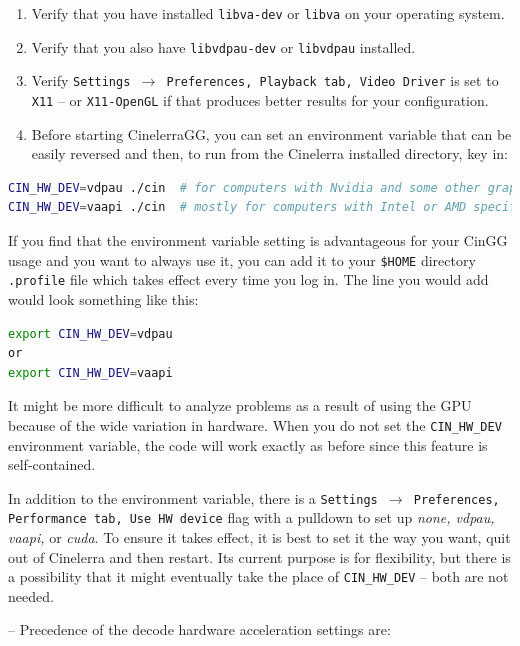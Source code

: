 \begin{enumerate}
	\item Verify that you have installed \texttt{libva-dev} or \texttt{libva} on your operating system.
	\item Verify that you also have \texttt{libvdpau-dev} or \texttt{libvdpau} installed.
	\item Verify \texttt{Settings $\rightarrow$ Preferences, Playback tab, Video Driver} is set to\texttt{ X11} -- or \texttt{X11-OpenGL} if that	produces better results for your configuration.
	\item Before starting CinelerraGG, you can set an environment variable that can be easily reversed and
	then, to run from the Cinelerra installed directory, key in:
\end{enumerate}

\begin{lstlisting}[language=bash,numbers=none]
CIN_HW_DEV=vdpau ./cin	# for computers with Nvidia and some other graphics cards
CIN_HW_DEV=vaapi ./cin	# mostly for computers with Intel or AMD specific graphics hardware
\end{lstlisting}

If you find that the environment variable setting is advantageous for your CinGG usage and you want to always use it, you can add it to your \texttt{\$HOME} directory \texttt{.profile} file which takes effect every time you log in.  The line you would add would look something like this:

\begin{lstlisting}[language=bash,numbers=none]
export CIN_HW_DEV=vdpau
or
export CIN_HW_DEV=vaapi
\end{lstlisting}

It might be more difficult to analyze problems as a result of using the GPU because of the wide variation in hardware.  When you do not set the \texttt{CIN\_HW\_DEV} environment variable, the code will work exactly as before since this feature is self-contained.

In addition to the environment variable,  there is a \texttt{Settings $\rightarrow$ Preferences, Performance tab, Use HW device} flag with a pulldown to set up \textit{none, vdpau, vaapi,} or \textit{cuda}.  To ensure it takes effect, it is best to set it the way you want, quit out of Cinelerra and then restart.  Its current purpose is for flexibility, but there is a possibility that it might eventually take the place of \texttt{CIN\_HW\_DEV} -- both are not needed.

-- Precedence of the decode hardware acceleration settings are:

